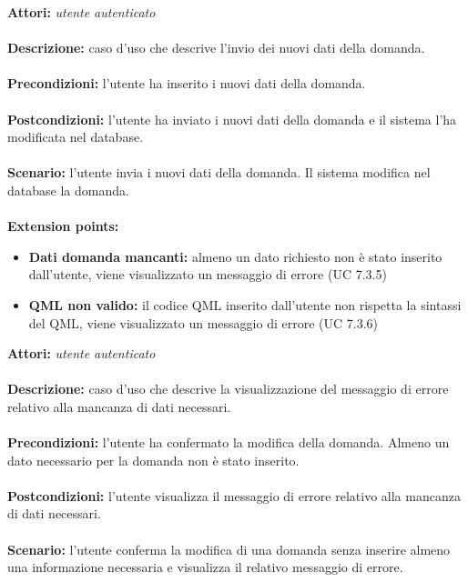 \documentclass[a4paper,11pt]{article}
\begin{document}

\textbf{Attori:} \textit{utente autenticato}
\\ \\
\textbf{Descrizione:} caso d'uso che descrive l'invio dei nuovi dati della domanda.\\
\\
\textbf{Precondizioni:} l'utente ha inserito i nuovi dati della domanda.\\
\\
\textbf{Postcondizioni:} l’utente ha inviato i nuovi dati della domanda e il sistema l'ha modificata nel database.\\
\\
\textbf{Scenario:} l’utente invia i nuovi dati della domanda. Il sistema modifica nel database la domanda.\\
\\
\textbf{Extension points:} 
\begin{itemize}
	\item \textbf{Dati domanda mancanti:} almeno un dato richiesto non è stato inserito dall'utente, viene visualizzato un messaggio di errore (UC 7.3.5)
	\item \textbf{QML non valido:} il codice QML inserito dall'utente non rispetta la sintassi del QML, viene visualizzato un messaggio di errore (UC 7.3.6)
\end{itemize}



\textbf{Attori:} \textit{utente autenticato}
\\ \\
\textbf{Descrizione:} caso d'uso che descrive la visualizzazione del messaggio di errore relativo alla mancanza di dati necessari.\\
\\
\textbf{Precondizioni:} l'utente ha confermato la modifica della domanda. Almeno un dato necessario per la domanda non è stato inserito.\\
\\
\textbf{Postcondizioni:} l’utente visualizza il messaggio di errore relativo alla mancanza di dati necessari.\\
\\
\textbf{Scenario:} l'utente conferma la modifica di una domanda senza inserire almeno una informazione necessaria e visualizza il relativo messaggio di errore.\\
\end{document}

